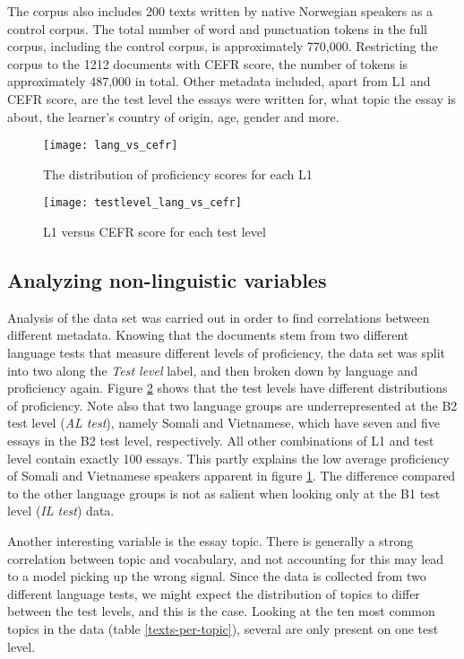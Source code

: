 The corpus also includes 200 texts written by native Norwegian speakers as a
control corpus. The total number of word and punctuation tokens in the full
corpus, including the control corpus, is approximately 770,000. Restricting
the corpus to the 1212 documents with CEFR score, the number of tokens is
approximately 487,000 in total. Other metadata included, apart from L1 and
CEFR score, are the test level the essays were written for, what topic the
essay is about, the learner's country of origin, age, gender and more.


\begin{figure}
  \centering
  \texttt{[image: lang\_vs\_cefr]}
  \caption{The distribution of proficiency scores for each L1}
  \label{lang-vs-cefr}
\end{figure}
 
\begin{figure}
  \centering
  \texttt{[image: testlevel\_lang\_vs\_cefr]}
  \caption{L1 versus CEFR score for each test level}
  \label{testlevel-lang-vs-cefr}
\end{figure}
 

\subsection{Analyzing non-linguistic variables}

Analysis of the data set was carried out in order to find correlations
between different metadata. Knowing that the documents stem from two
different language tests that measure different levels of proficiency, the
data set was split into two along the \emph{Test level} label, and then broken
down by language and proficiency again. Figure \ref{testlevel-lang-vs-cefr}
shows that the test levels have different distributions of proficiency. Note
also that two language groups are underrepresented at the B2 test level
(\emph{AL test}), namely Somali and Vietnamese, which have seven and five
essays in the B2 test level, respectively. All other combinations of L1 and
test level contain exactly 100 essays. This partly explains the low average
proficiency of Somali and Vietnamese speakers apparent in figure
\ref{lang-vs-cefr}. The difference compared to the other language groups is
not as salient when looking only at the B1 test level (\emph{IL test}) data.

Another interesting variable is the essay topic. There is generally a strong
correlation between topic and vocabulary, and not accounting for this may
lead to a model picking up the wrong signal. Since the data is collected from
two different language tests, we might expect the distribution of topics to
differ between the test levels, and this is the case. Looking at the ten most
common topics in the data (table \ref{texts-per-topic}), several are only
present on one test level.


